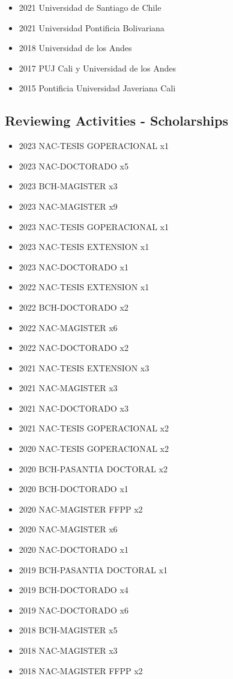 {\begin{itemize}
\item 2021 Universidad de Santiago de Chile
\end{itemize}
}

{\begin{itemize}
\item 2021 Universidad Pontificia Bolivariana
\item 2018 Universidad de los Andes
\item 2017 PUJ Cali y Universidad de los Andes
\item 2015 Pontificia Universidad Javeriana Cali
\end{itemize}
}
\clearpage

\subsection{Reviewing Activities - Scholarships}

{\begin{itemize}
\item 2023 NAC-TESIS GOPERACIONAL x1
\item 2023 NAC-DOCTORADO x5
\item 2023 BCH-MAGISTER x3
\item 2023 NAC-MAGISTER x9
\item 2023 NAC-TESIS GOPERACIONAL x1
\item 2023 NAC-TESIS EXTENSION x1
\item 2023 NAC-DOCTORADO x1
\item 2022 NAC-TESIS EXTENSION x1
\item 2022 BCH-DOCTORADO x2
\item 2022 NAC-MAGISTER x6
\item 2022 NAC-DOCTORADO x2
\item 2021 NAC-TESIS EXTENSION x3
\item 2021 NAC-MAGISTER x3
\item 2021 NAC-DOCTORADO x3
\item 2021 NAC-TESIS GOPERACIONAL x2
\item 2020 NAC-TESIS GOPERACIONAL x2
\item 2020 BCH-PASANTIA DOCTORAL x2
\item 2020 BCH-DOCTORADO x1
\item 2020 NAC-MAGISTER FFPP x2
\item 2020 NAC-MAGISTER x6
\item 2020 NAC-DOCTORADO x1
\item 2019 BCH-PASANTIA DOCTORAL x1
\item 2019 BCH-DOCTORADO x4
\item 2019 NAC-DOCTORADO x6
\item 2018 BCH-MAGISTER x5
\item 2018 NAC-MAGISTER x3
\item 2018 NAC-MAGISTER FFPP x2
\end{itemize}
}

